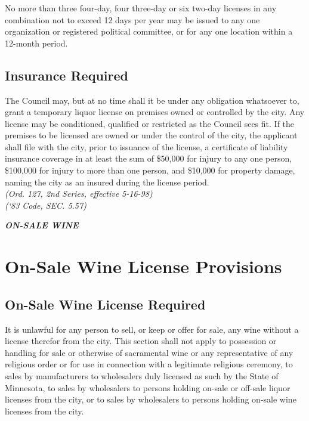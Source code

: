\subsubsection{}
No more than three four-day, four three-day or six two-day licenses in any combination not to exceed 12 days per year may be issued to any one organization or registered political committee, or for any one location within a 12-month period.
\subsection{Insurance Required}
The Council may, but at no time shall it be under any obligation whatsoever to, grant a temporary liquor license on premises owned or controlled by the city.  Any license may be conditioned, qualified or restricted as the Council sees fit.  If the premises to be licensed are owned or under the control of the city, the applicant shall file with the city, prior to issuance of the license, a certificate of liability insurance coverage in at least the sum of \$50,000 for injury to any one person, \$100,000 for injury to more than one person, and \$10,000 for property damage, naming the city as an insured during the license period.\\
\emph{(Ord. 127, 2nd Series, effective 5-16-98)}\\
\emph{(‘83 Code, SEC. 5.57)}

\begin{center}
    \emph{\textbf{\LARGE{ON-SALE WINE}}}
\end{center}

\setcounter{section}{99}
\section{On-Sale Wine License Provisions}
\subsection{On-Sale Wine License Required}
It is unlawful for any person to sell, or keep or offer for sale, any wine without a license therefor from the city. This section shall not apply to possession or handling for sale or otherwise of sacramental wine or any representative of any religious order or for use in connection with a legitimate religious ceremony, to sales by manufacturers to wholesalers duly licensed as such by the State of Minnesota, to sales by wholesalers to persons holding on-sale or off-sale liquor licenses from the city, or to sales by wholesalers to persons holding on-sale wine licenses from the city.
